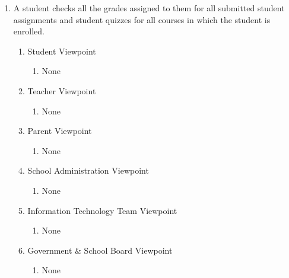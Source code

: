 \documentclass[]{article}
\begin{document}
\begin{enumerate}[{BE}1.]
	\item A student checks all the grades assigned to them for all submitted student assignments and student quizzes for all courses in which the student is enrolled.
	\begin{enumerate}[{VP2}.1]
		\item Student Viewpoint
			\begin{enumerate}
				\item None
			\end{enumerate}
		\item Teacher Viewpoint
			\begin{enumerate}
				\item None
			\end{enumerate}
		\item Parent Viewpoint
			\begin{enumerate}
				\item None
			\end{enumerate}
		\item School Administration Viewpoint
			\begin{enumerate}
				\item None
			\end{enumerate}
		\item Information Technology Team Viewpoint
			\begin{enumerate}
				\item None
			\end{enumerate}
		\item Government \& School Board Viewpoint
			\begin{enumerate}
				\item None
			\end{enumerate}
	\end{enumerate}


\end{enumerate}
\end{document}
